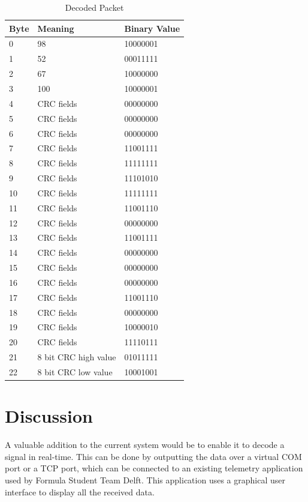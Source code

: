 \documentclass{IEEEtran}
\begin{document}
\begin{table}[h]
\centering
\caption{Decoded Packet}
\label{tbl1}
\begin{tabular}{lll}
Byte & Meaning & Binary Value \\
\hline
0       & 98                          & 10000001  \\
1       & 52                          & 00011111  \\
2       & 67                          & 10000000   \\
3       & 100                         & 10000001    \\
4      & CRC fields                   & 00000000 \\
5      & CRC fields                   & 00000000 \\
6      & CRC fields                   & 00000000 \\
7      & CRC fields                   & 11001111 \\
8      & CRC fields                   & 11111111 \\
9      & CRC fields                   & 11101010 \\
10      & CRC fields                  & 11111111 \\
11     & CRC fields                   & 11001110 \\
12     & CRC fields                   & 00000000 \\
13     & CRC fields                   & 11001111 \\
14     & CRC fields                   & 00000000 \\
15     & CRC fields                   & 00000000 \\
16     & CRC fields                   & 00000000 \\
17     & CRC fields                   & 11001110 \\
18     & CRC fields                   & 00000000 \\
19     & CRC fields                   & 10000010 \\
20     & CRC fields                   & 11110111 \\
21     & 8 bit CRC high value       & 01011111 \\
22     & 8 bit CRC low value        & 10001001 \\
\end{tabular}
\end{table}

\section{Discussion}

A valuable addition to the current system would be to enable it to decode a signal in real-time. This can be done by outputting the data over a virtual COM port or a TCP port, which can be connected to an existing telemetry application used by Formula Student Team Delft. This application uses a graphical user interface to display all the received data.
\printbibliography
\end{document}
